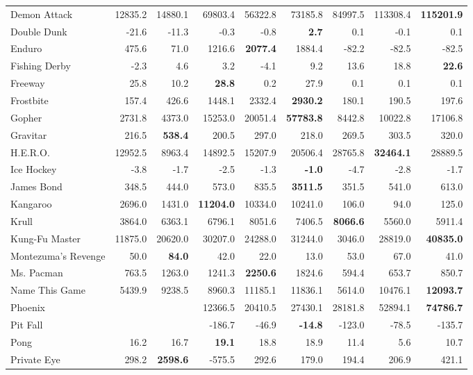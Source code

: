 \documentclass{article} \usepackage{times}
\begin{document}
\begin{table*}[h]
\begin{scriptsize}
\begin{tabular}{lrrrrrrrr}
Demon Attack & 12835.2 & 14880.1 & 69803.4 & 56322.8 & 73185.8 & 84997.5 & 113308.4 & \textbf{115201.9}\\
Double Dunk & -21.6 & -11.3 & -0.3 & -0.8 & \textbf{2.7} & 0.1 & -0.1 & 0.1\\
Enduro & 475.6 & 71.0 & 1216.6 & \textbf{2077.4} & 1884.4 & -82.2 & -82.5 & -82.5\\
Fishing Derby & -2.3 & 4.6 & 3.2 & -4.1 & 9.2 & 13.6 & 18.8 & \textbf{22.6}\\
Freeway & 25.8 & 10.2 & \textbf{28.8} & 0.2 & 27.9 & 0.1 & 0.1 & 0.1\\
Frostbite & 157.4 & 426.6 & 1448.1 & 2332.4 & \textbf{2930.2} & 180.1 & 190.5 & 197.6\\
Gopher & 2731.8 & 4373.0 & 15253.0 & 20051.4 & \textbf{57783.8} & 8442.8 & 10022.8 & 17106.8\\
Gravitar & 216.5 & \textbf{538.4} & 200.5 & 297.0 & 218.0 & 269.5 & 303.5 & 320.0\\
H.E.R.O. & 12952.5 & 8963.4 & 14892.5 & 15207.9 & 20506.4 & 28765.8 & \textbf{32464.1} & 28889.5\\
Ice Hockey & -3.8 & -1.7 & -2.5 & -1.3 & \textbf{-1.0} & -4.7 & -2.8 & -1.7\\
James Bond & 348.5 & 444.0 & 573.0 & 835.5 & \textbf{3511.5} & 351.5 & 541.0 & 613.0\\
Kangaroo & 2696.0 & 1431.0 & \textbf{11204.0} & 10334.0 & 10241.0 & 106.0 & 94.0 & 125.0\\
Krull & 3864.0 & 6363.1 & 6796.1 & 8051.6 & 7406.5 & \textbf{8066.6} & 5560.0 & 5911.4\\
Kung-Fu Master & 11875.0 & 20620.0 & 30207.0 & 24288.0 & 31244.0 & 3046.0 & 28819.0 & \textbf{40835.0}\\
Montezuma's Revenge & 50.0 & \textbf{84.0} & 42.0 & 22.0 & 13.0 & 53.0 & 67.0 & 41.0\\
Ms. Pacman & 763.5 & 1263.0 & 1241.3 & \textbf{2250.6} & 1824.6 & 594.4 & 653.7 & 850.7\\
Name This Game & 5439.9 & 9238.5 & 8960.3 & 11185.1 & 11836.1 & 5614.0 & 10476.1 & \textbf{12093.7}\\
Phoenix &  &  & 12366.5 & 20410.5 & 27430.1 & 28181.8 & 52894.1 & \textbf{74786.7}\\
Pit Fall &  &  & -186.7 & -46.9 & \textbf{-14.8} & -123.0 & -78.5 & -135.7\\
Pong & 16.2 & 16.7 & \textbf{19.1} & 18.8 & 18.9 & 11.4 & 5.6 & 10.7\\
Private Eye & 298.2 & \textbf{2598.6} & -575.5 & 292.6 & 179.0 & 194.4 & 206.9 & 421.1\\

\end{tabular}
\end{scriptsize}
\end{table*}
\end{document}
